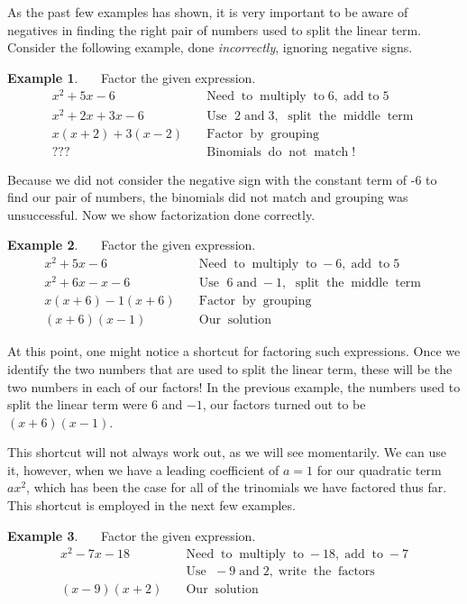 \documentclass[12pt]{book}
\theoremstyle{definition}
\newtheorem{example}{Example}
\newcommand{\tmop}[1]{\ensuremath{\operatorname{#1}}}
\begin{document}
As the past few examples has shown, it is very important to be aware of negatives in finding the right pair of numbers used to split the linear term. Consider the following example, done {\it incorrectly}, ignoring negative signs.
\begin{example}~~~Factor the given expression.
  \begin{eqnarray*}
    x^2 + 5 x - 6 &  & \tmop{Need} \tmop{to} \tmop{multiply} \tmop{to} 6,
    \tmop{add~to} 5\\
    x^2 + 2 x + 3 x - 6 &  & \tmop{Use~} 2 \tmop{and} 3, \tmop{~split} \tmop{the}
    \tmop{middle} \tmop{term}\\
    x (x + 2) + 3 (x - 2) &  & \tmop{Factor} \tmop{by} \tmop{grouping}\\
    ? ? ? &  & \tmop{Binomials} \tmop{do} \tmop{not} \tmop{match} !
  \end{eqnarray*}
\end{example}
Because we did not consider the negative sign with the constant term of -6 to find our pair of numbers, the binomials did not match and grouping was unsuccessful. Now we show factorization done correctly.
\begin{example}~~~Factor the given expression.
  \begin{eqnarray*}
    x^2 + 5 x - 6 &  & \tmop{Need} \tmop{to} \tmop{multiply} \tmop{to} - 6,
    \tmop{add} \tmop{to} 5\\
    x^2 + 6 x - x - 6 &  & \tmop{Use~} 6 \tmop{and} - 1, \tmop{~split} \tmop{the}
    \tmop{middle} \tmop{term}\\
    x (x + 6) - 1 (x + 6) &  & \tmop{Factor} \tmop{by} \tmop{grouping}\\
    (x + 6) (x - 1) &  & \tmop{Our} \tmop{solution}
  \end{eqnarray*}
\end{example}	
At this point, one might notice a shortcut for factoring such expressions. Once we identify the two numbers that are used to split the linear term, these will be the two numbers in each of our factors! In the previous example, the numbers used to split the linear term were 6 and $- 1$, our factors turned out to be $(x + 6) (x - 1)$.\par
This shortcut will not always work out, as we will see momentarily.  We can use it, however, when we have a leading coefficient of $a=1$ for our quadratic term $ax^2$, which has been the case for all of the trinomials we have factored thus far. This shortcut is employed in the next few examples.
\begin{example}~~~Factor the given expression.
  \begin{eqnarray*}
    x^2 - 7 x - 18 &  & \tmop{Need} \tmop{to} \tmop{multiply} \tmop{to} - 18,
    \tmop{add} \tmop{to} - 7\\
    &  & \tmop{Use~} - 9 \tmop{and} 2, \tmop{write} \tmop{the} \tmop{factors}\\
    (x - 9) (x + 2) &  & \tmop{Our} \tmop{solution}
  \end{eqnarray*}
\end{example}	
\end{document}
